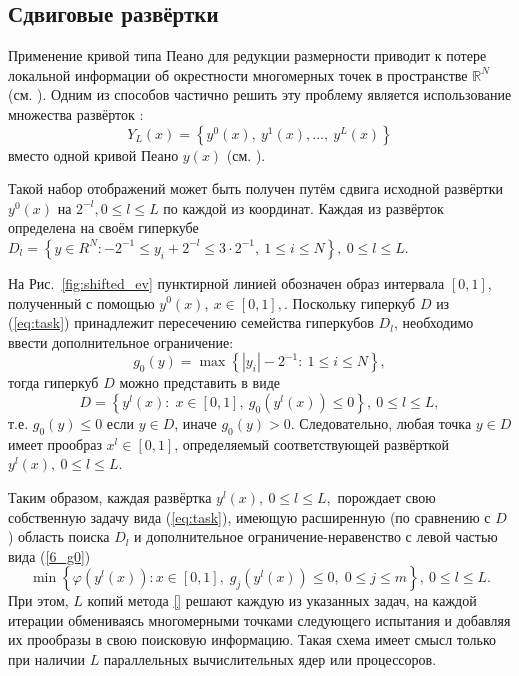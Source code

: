 \subsection{Сдвиговые развёртки}
\label{sec:shifted}

Применение кривой типа Пеано для редукции размерности приводит к потере локальной информации об окрестности многомерных точек
в пространстве $\mathbb{R}^N$ (см. \cite{Strongin1992}).
Одним из способов частично решить эту проблему является использование множества развёрток \cite{Strongin1992}:
\begin{equation}%
Y_L(x)=\left\{y^0(x),\ y^1(x),...,\ y^L(x)\right\}
\end{equation}
вместо одной кривой Пеано $y(x)$ (см. \cite{Strongin1992,strSergGO,Strongin1991}).

Такой набор отображений может быть получен путём сдвига исходной развёртки $y^0(x)$ на $2^{-l},0
\leq l \leq L$ по каждой из координат. Каждая из развёрток определена на своём гиперкубе $D_l=
\left\{y \in R^N: -2^{-1} \leq y_i+2^{-l} \leq 3 \cdot 2^{-1},\ 1\leq i\leq N\right\},\ 0 \leq l \leq
L$.

На Рис.~\ref{fig:shifted_ev} пунктирной линией обозначен образ интервала $[0,1]$, полученный с помощью $y^0(x),\
x\in [0,1],$. Поскольку гиперкуб $D$ из (\ref{eq:task}) принадлежит пересечению
семейства гиперкубов $D_l$, необходимо ввести дополнительное ограничение:
\begin{equation}\label{6_g0}
g_0(y)=\max\left\{\left|y_i\right| - 2^{-1}:\ 1\leq i\leq N\right\},
\end{equation}
тогда гиперкуб $D$ можно представить в виде
\[
D=\left\{y^l(x):\; x\in [0,1],\ g_0(y^l(x))\leq 0 \right\},\ 0\leq l \leq L,
\]
т.е. $g_0(y) \leq 0$ если $y\in D$, иначе $g_0(y)>0$. Следовательно, любая точка $y \in D$
имеет прообраз $x^l \in [0,1]$, определяемый соответствующей развёрткой $y^l(x),\ 0\leq l\leq L$.

Таким образом, каждая развёртка $y^l(x),\ 0\leq l \leq L,$ порождает свою собственную задачу вида
(\ref{eq:task}), имеющую расширенную (по сравнению с $D$) область поиска $D_l$
и дополнительное ограничение-неравенство с левой частью вида (\ref{6_g0})
\begin{equation}\label{6_problem_l}
\min{\left\{\varphi(y^l(x)):x\in [0,1], \; g_j(y^l(x))\leq 0, \; 0 \leq j \leq m\right\}}, \ 0 \leq l \leq L.
\end{equation}
При этом, $L$ копий метода \ref{} решают каждую из указанных задач, на каждой итерации обмениваясь многомерными точками
следующего испытания и добавляя их прообразы в свою поисковую информацию. Такая схема имеет смысл только при
наличии $L$ параллельных вычислительных ядер или процессоров.

